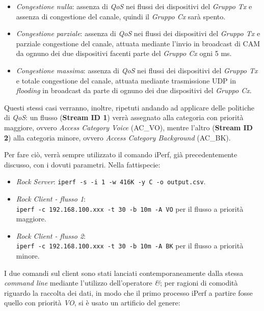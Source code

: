 \begin{itemize}
    \item \textit{Congestione nulla}: assenza di \textit{QoS} nei flussi dei dispositivi del \textit{Gruppo Tx} e assenza di congestione del canale, quindi il \textit{Gruppo Cx} sarà spento.
    \item \textit{Congestione parziale}: assenza di \textit{QoS} nei flussi dei dispositivi del \textit{Gruppo Tx} e parziale congestione del canale, attuata mediante l'invio in broadcast di CAM da ognuno dei due dispositivi facenti parte del \textit{Gruppo Cx} ogni 5 ms.
    \item \textit{Congestione massima}: assenza di \textit{QoS} nei flussi dei dispositivi del \textit{Gruppo Tx} e totale congestione del canale, attuata mediante trasmissione UDP in \textit{flooding} in broadcast da parte di ognuno dei due dispositivi del \textit{Gruppo Cx}.
\end{itemize}

Questi stessi casi verranno, inoltre, ripetuti andando ad applicare delle politiche di \textit{QoS}: un flusso (\textbf{Stream ID 1}) verrà assegnato alla categoria con priorità maggiore, ovvero \textit{Access Category Voice} (AC\_VO), mentre l'altro (\textbf{Stream ID 2}) alla categoria minore, ovvero \textit{Access Category Background} (AC\_BK).

Per fare ciò, verrà sempre utilizzato il comando iPerf, già precedentemente discusso, con i dovuti parametri. Nella fattispecie:

\begin{itemize}
    \item \textit{Rock Server}: \verb|iperf -s -i 1 -w 416K -y C -o output.csv|.
    \item \textit{Rock Client - flusso 1}: \\\verb|iperf -c 192.168.100.xxx -t 30 -b 10m -A VO| per il flusso a priorità maggiore.
    \item \textit{Rock Client - flusso 2}: \\\verb|iperf -c 192.168.100.xxx -t 30 -b 10m -A BK| per il flusso a priorità minore.
\end{itemize}

I due comandi sul client sono stati lanciati contemporaneamente dalla stessa \textit{command line} mediante l'utilizzo dell'operatore \textit{\&}; per ragioni di comodità riguardo la raccolta dei dati, in modo che il primo processo iPerf a partire fosse quello con priorità \textit{VO}, si è usato un artificio del genere:

